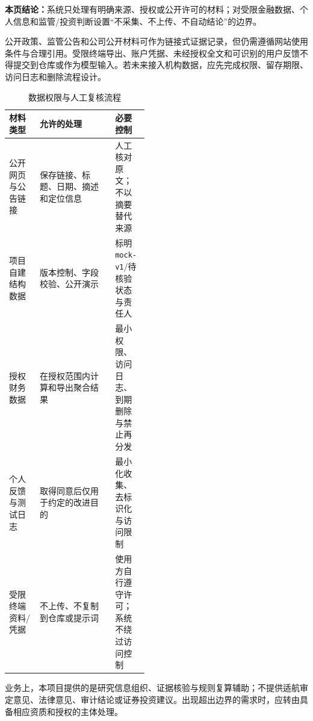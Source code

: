 \textbf{本页结论：}系统只处理有明确来源、授权或公开许可的材料；对受限金融数据、个人信息和监管/投资判断设置“不采集、不上传、不自动结论”的边界。

公开政策、监管公告和公司公开材料可作为链接式证据记录，但仍需遵循网站使用条件与合理引用。受限终端导出、账户凭据、未经授权全文和可识别的用户反馈不得提交到仓库或作为模型输入。若未来接入机构数据，应先完成权限、留存期限、访问日志和删除流程设计。

\begin{table}[htbp]
\centering
\caption{数据权限与人工复核流程}
\label{tab:wty-data-governance}
\small
\begin{tabularx}{\linewidth}{p{0.22\linewidth}X p{0.24\linewidth}}
\toprule
材料类型 & 允许的处理 & 必要控制 \\
\midrule
公开网页与公告链接 & 保存链接、标题、日期、摘述和定位信息 & 人工核对原文；不以摘要替代来源 \\
项目自建结构数据 & 版本控制、字段校验、公开演示 & 标明 \texttt{mock-v1}/待核验状态与责任人 \\
授权财务数据 & 在授权范围内计算和导出聚合结果 & 最小权限、访问日志、到期删除与禁止再分发 \\
个人反馈与测试日志 & 取得同意后仅用于约定的改进目的 & 最小化收集、去标识化与访问限制 \\
受限终端资料/凭据 & 不上传、不复制到仓库或提示词 & 使用方自行遵守许可；系统不绕过访问控制 \\
\bottomrule
\end{tabularx}
\end{table}

业务上，本项目提供的是研究信息组织、证据核验与规则复算辅助；不提供适航审定意见、法律意见、审计结论或证券投资建议。出现超出边界的需求时，应转由具备相应资质和授权的主体处理。
